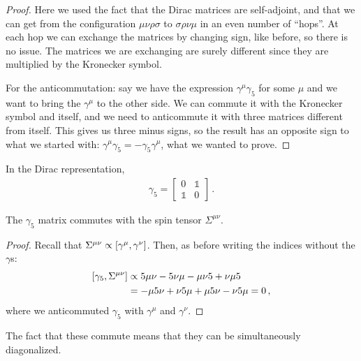 \documentclass[main.tex]{subfiles}
\begin{document}
\begin{proof}
Here we used the fact that the Dirac matrices are self-adjoint, and that we can get from the configuration \(\mu \nu \rho \sigma \) to \(\sigma \rho \nu \mu \) in an even number of ``hops''. At each hop we can exchange the matrices by changing sign, like before, so there is no issue. The matrices we are exchanging are surely different since they are multiplied by the Kronecker symbol.

For the anticommutation: say we have the expression \(\gamma^{\mu } \gamma_5 \) for some \(\mu \) and we want to bring the \(\gamma^{\mu } \) to the other side. We can commute it with the Kronecker symbol and itself, and we need to anticommute it with three matrices different from itself. This gives us three minus signs, so the result has an opposite sign to what we started with: \(\gamma^{\mu } \gamma_5 = - \gamma_5 \gamma^{\mu }\), what we wanted to prove. 
\end{proof}

In the Dirac representation, 
%
\begin{subequations}
\begin{align}
\gamma_5 = \left[\begin{array}{cc}
0 & \mathbb{1} \\ 
\mathbb{1} & 0
\end{array}\right] 
\,.
\end{align}
\end{subequations}
%

\begin{claim}
The \(\gamma_{5}\) matrix commutes with the spin tensor \(\Sigma^{\mu \nu }\).
\end{claim}

\begin{proof}
Recall that \(\Sigma^{\mu \nu} \propto \qty[\gamma^{\mu}, \gamma^{\nu }]\). Then, as before writing the indices without the \(\gamma \)s: 
%
\begin{subequations}
\begin{align}
\qty[\gamma_5, \Sigma^{\mu \nu }] &\propto 5 \mu \nu - 5 \nu \mu - \mu \nu 5 + \nu \mu 5   \\
&= -\mu 5 \nu + \nu 5 \mu + \mu 5 \nu - \nu 5 \mu  =0
\,,
\end{align}
\end{subequations}
%
where we anticommuted \(\gamma_5 \) with \(\gamma^{\mu }\) and \(\gamma^{\nu }\).
\end{proof}

The fact that these commute means that they can be simultaneously diagonalized.
\end{document}
